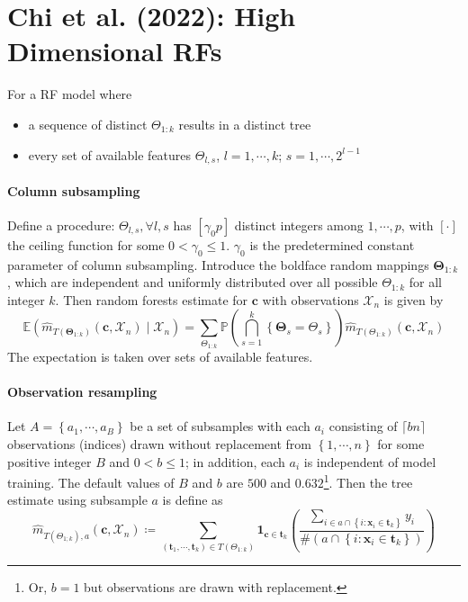 \documentclass[twoside]{article}
\begin{document}
\section{Chi et al. (2022): High Dimensional RFs}
For a RF model where
\begin{itemize}
    \item a sequence of distinct $\Theta_{1:k}$ results in a distinct tree
    \item every set of available features $\Theta_{l,s}$, $l=1,\cdots,k$; $s=1,\cdots,2^{l-1}$
\end{itemize}

\paragraph*{Column subsampling} Define a  procedure: $\Theta_{l,s},\forall l,s$ has $[\gamma_0p]$ distinct integers among $1,\cdots,p$, with $[\cdot]$ the ceiling function for some $0<\gamma_0\leq 1$. $\gamma_0$ is the predetermined constant parameter of column subsampling.
Introduce the boldface random mappings $\boldsymbol{\Theta}_{1:k}$, which are independent and uniformly distributed over all possible $\Theta_{1:k}$ for all integer $k$. Then random forests estimate for $\mathbf{c}$ with observations $\mathcal{X}_n$ is given by 
\begin{equation*}
    \mathbb{E}\left( \hat{m}_{T(\boldsymbol{\Theta}_{1:k})}\left(\mathbf{c},\mathcal{X}_n\right) \mid \mathcal{X}_n \right) = \sum_{\Theta_{1:k}} \mathbb{P} \left( \bigcap^k_{s=1} \left\{ \boldsymbol{\Theta}_s = \Theta_s \right\} \right) \hat{m}_{T(\Theta_{1:k})} \left(\mathbf{c},\mathcal{X}_n\right)
\end{equation*}
The expectation is taken over sets of available features.

\paragraph*{Observation resampling}
Let $A=\left\{a_1,\cdots, a_B\right\}$ be a set of subsamples with each $a_i$ consisting of $\lceil bn\rceil$ observations (indices) drawn without replacement from $\left\{1,\cdots,n\right\}$ for some positive integer $B$ and $0<b\leq 1$; in addition, each $a_i$ is independent of model training. The default values of $B$ and $b$ are $500$ and $0.632$\footnote{Or, $b=1$ but observations are drawn with replacement.}. Then the tree estimate using subsample $a$ is 
define as 
$$
\hat{m}_{T(\Theta_{1;k}),a}\left(\mathbf{c},\mathcal{X}_n\right) \coloneq \sum_{\left( \mathbf{t}_1,\cdots,\mathbf{t}_k \right)\in T(\Theta_{1:k})}\mathbf{1}_{\mathbf{c}\in\mathbf{t}_k}\left( \frac{\sum_{i\in a\cap \left\{i:\mathbf{x}_i\in\mathbf{t}_k\right\} }y_i}{\#\left(a\cap \left\{i:\mathbf{x}_i\in\mathbf{t}_k\right\}\right) } \right)
$$

\citet{chi2022asymptotic}

\newpage


\end{document}
